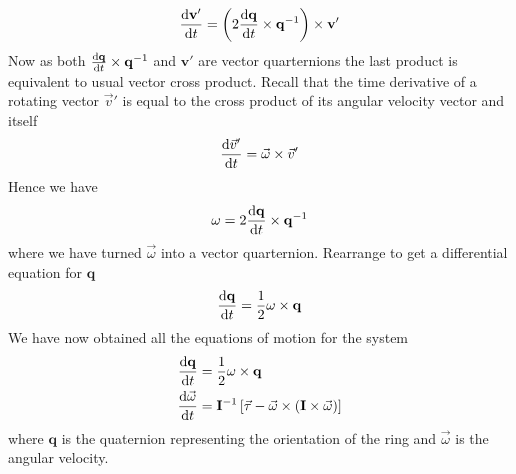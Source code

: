 \begin{equation}
    \frac{\textrm{d}\mathbf{v}'}{\textrm{d} t} = \left(2\frac{\textrm{d}\mathbf{q}}{\textrm{d} t}\times \mathbf{q}^{-1}\right) \times \mathbf{v}'
\end{equation}
Now as both \( \frac{\textrm{d}\mathbf{q}}{\textrm{d} t}\times \mathbf{q}^{-1} \) and \( \mathbf{v}' \) are vector quarternions the last product is
equivalent to usual vector cross product.
Recall that the time derivative of a rotating vector \( \vec{v}' \) is equal to the cross product of its angular velocity vector
and itself
\begin{equation}
    \frac{\textrm{d}\vec{v}'}{\textrm{d} t} = \vec{\omega} \times \vec{v}'
\end{equation}
Hence we have
\begin{equation}
    \mathbf{\omega} = 2\frac{\textrm{d}\mathbf{q}}{\textrm{d} t}\times \mathbf{q}^{-1}
\end{equation}
where we have turned \( \vec{\omega} \) into a vector quarternion.
Rearrange to get a differential equation for \( \mathbf{q} \)
\begin{equation}
    \frac{\textrm{d}\mathbf{q}}{\textrm{d} t} = \frac{1}{2} \mathbf{\omega} \times \mathbf{q}
\end{equation}
We have now obtained all the equations of motion for the system
\begin{align}
    \frac{\textrm{d}\mathbf{q}}{\textrm{d} t}   & = \frac{1}{2} \mathbf{\omega} \times \mathbf{q}\label{eq:quaternion_eom}                                      \\
    \frac{\textrm{d}\vec{\omega}}{\textrm{d} t} & = {\mathbf{I}}^{-1} \left[\vec{\tau} - \vec{\omega} \times \left(\mathbf{I} \times \vec{\omega}\right)\right]
\end{align}
where \( \mathbf{q} \) is the quaternion representing the orientation of the ring and \( \vec{\omega} \) is the angular velocity.

